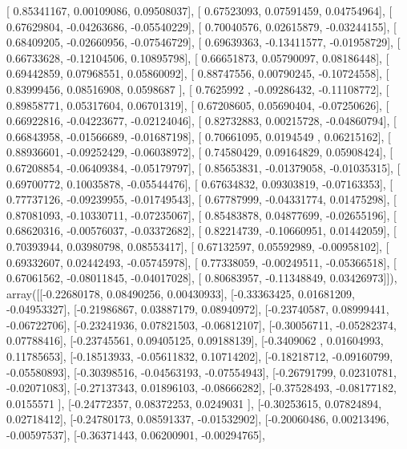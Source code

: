 \documentclass{article}
\begin{document}
       [ 0.85341167,  0.00109086,  0.09508037],
       [ 0.67523093,  0.07591459,  0.04754964],
       [ 0.67629804, -0.04263686, -0.05540229],
       [ 0.70040576,  0.02615879, -0.03244155],
       [ 0.68409205, -0.02660956, -0.07546729],
       [ 0.69639363, -0.13411577, -0.01958729],
       [ 0.66733628, -0.12104506,  0.10895798],
       [ 0.66651873,  0.05790097,  0.08186448],
       [ 0.69442859,  0.07968551,  0.05860092],
       [ 0.88747556,  0.00790245, -0.10724558],
       [ 0.83999456,  0.08516908,  0.0598687 ],
       [ 0.7625992 , -0.09286432, -0.11108772],
       [ 0.89858771,  0.05317604,  0.06701319],
       [ 0.67208605,  0.05690404, -0.07250626],
       [ 0.66922816, -0.04223677, -0.02124046],
       [ 0.82732883,  0.00215728, -0.04860794],
       [ 0.66843958, -0.01566689, -0.01687198],
       [ 0.70661095,  0.0194549 ,  0.06215162],
       [ 0.88936601, -0.09252429, -0.06038972],
       [ 0.74580429,  0.09164829,  0.05908424],
       [ 0.67208854, -0.06409384, -0.05179797],
       [ 0.85653831, -0.01379058, -0.01035315],
       [ 0.69700772,  0.10035878, -0.05544476],
       [ 0.67634832,  0.09303819, -0.07163353],
       [ 0.77737126, -0.09239955, -0.01749543],
       [ 0.67787999, -0.04331774,  0.01475298],
       [ 0.87081093, -0.10330711, -0.07235067],
       [ 0.85483878,  0.04877699, -0.02655196],
       [ 0.68620316, -0.00576037, -0.03372682],
       [ 0.82214739, -0.10660951,  0.01442059],
       [ 0.70393944,  0.03980798,  0.08553417],
       [ 0.67132597,  0.05592989, -0.00958102],
       [ 0.69332607,  0.02442493, -0.05745978],
       [ 0.77338059, -0.00249511, -0.05366518],
       [ 0.67061562, -0.08011845, -0.04017028],
       [ 0.80683957, -0.11348849,  0.03426973]]), array([[-0.22680178,  0.08490256,  0.00430933],
       [-0.33363425,  0.01681209, -0.04953327],
       [-0.21986867,  0.03887179,  0.08940972],
       [-0.23740587,  0.08999441, -0.06722706],
       [-0.23241936,  0.07821503, -0.06812107],
       [-0.30056711, -0.05282374,  0.07788416],
       [-0.23745561,  0.09405125,  0.09188139],
       [-0.3409062 ,  0.01604993,  0.11785653],
       [-0.18513933, -0.05611832,  0.10714202],
       [-0.18218712, -0.09160799, -0.05580893],
       [-0.30398516, -0.04563193, -0.07554943],
       [-0.26791799,  0.02310781, -0.02071083],
       [-0.27137343,  0.01896103, -0.08666282],
       [-0.37528493, -0.08177182,  0.0155571 ],
       [-0.24772357,  0.08372253,  0.0249031 ],
       [-0.30253615,  0.07824894,  0.02718412],
       [-0.24780173,  0.08591337, -0.01532902],
       [-0.20060486,  0.00213496, -0.00597537],
       [-0.36371443,  0.06200901, -0.00294765],
\end{document}
